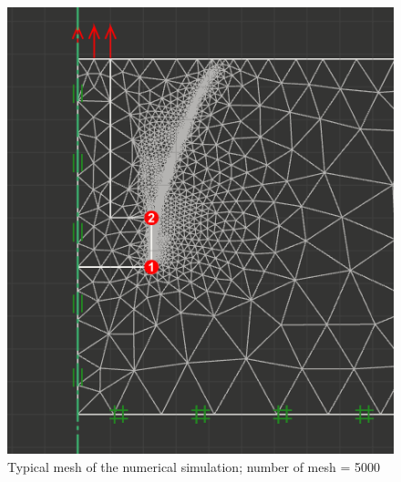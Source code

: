 \documentclass[a4paper, nobind]{templates/ociamthesis}
\begin{document}
\begin{figure}[H]
\includegraphics[width=1\linewidth]{myfigureeeeee/typicalresult2} \caption{Typical mesh of the numerical simulation; number of mesh = 5000}\label{fig:unnamed-chunk-35}
\end{figure}
\end{document}
